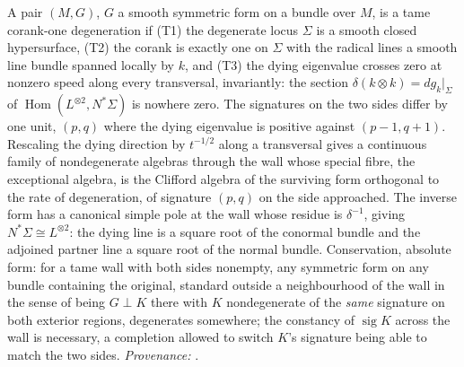 A pair $(M,G)$, $G$ a smooth symmetric form on a bundle over $M$, is a tame corank-one degeneration if (T1) the degenerate locus $\Sigma$ is a smooth closed hypersurface, (T2) the corank is exactly one on $\Sigma$ with the radical lines a smooth line bundle spanned locally by $k$, and (T3) the dying eigenvalue crosses zero at nonzero speed along every transversal, invariantly: the section $\delta(k \otimes k) = dg_{k}|_{\Sigma}$ of $\operatorname{Hom}(L^{\otimes 2}, N^{*}\Sigma)$ is nowhere zero. The signatures on the two sides differ by one unit, $(p,q)$ where the dying eigenvalue is positive against $(p-1, q+1)$. Rescaling the dying direction by $t^{-1/2}$ along a transversal gives a continuous family of nondegenerate algebras through the wall whose special fibre, the exceptional algebra, is the Clifford algebra of the surviving form orthogonal to the rate of degeneration, of signature $(p,q)$ on the side approached. The inverse form has a canonical simple pole at the wall whose residue is $\delta^{-1}$, giving $N^{*}\Sigma \cong L^{\otimes 2}$: the dying line is a square root of the conormal bundle and the adjoined partner line a square root of the normal bundle. Conservation, absolute form: for a tame wall with both sides nonempty, any symmetric form on any bundle containing the original, standard outside a neighbourhood of the wall in the sense of being $G \perp K$ there with $K$ nondegenerate of the \emph{same} signature on both exterior regions, degenerates somewhere; the constancy of $\operatorname{sig} K$ across the wall is necessary, a completion allowed to switch $K$'s signature being able to match the two sides. \emph{Provenance:} \cite[Hyp.~2.1, Lem.~2.2, Rem.~2.3, Prop.~6.1, Thm.~6.2, Thm.~5.1]{ButlerT4}.
